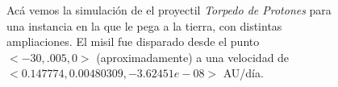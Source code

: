 \begin{figure}
{	\label{fig:res_misil_3}
	}
	\caption{
		Acá vemos la simulación de el proyectil \textit{Torpedo de Protones} para una instancia en la que le pega a la tierra,
		con distintas ampliaciones.
		El misil fue disparado desde el punto $<-30,.005, 0>$ (aproximadamente) a una velocidad de $<0.147774,0.00480309,-3.62451e-08>$ AU/día.
	}
	\label{ fig:res_misil }
\end{figure}
